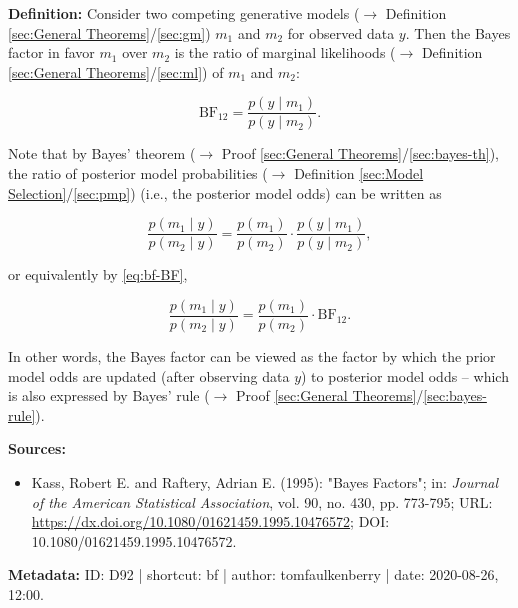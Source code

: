 \documentclass[a4paper,12pt,twoside]{book}
\begin{document}
\textbf{Definition:} Consider two competing generative models ($\rightarrow$ Definition \ref{sec:General Theorems}/\ref{sec:gm}) $m_1$ and $m_2$ for observed data $y$. Then the Bayes factor in favor $m_1$ over $m_2$ is the ratio of marginal likelihoods ($\rightarrow$ Definition \ref{sec:General Theorems}/\ref{sec:ml}) of $m_1$ and $m_2$:

\begin{equation} \label{eq:bf-BF}
\text{BF}_{12} = \frac{p(y\mid m_1)}{p(y\mid m_2)}.
\end{equation}

Note that by Bayes' theorem ($\rightarrow$ Proof \ref{sec:General Theorems}/\ref{sec:bayes-th}), the ratio of posterior model probabilities ($\rightarrow$ Definition \ref{sec:Model Selection}/\ref{sec:pmp}) (i.e., the posterior model odds) can be written as

\begin{equation} \label{eq:bf-odds}
\frac{p(m_1 \mid y)}{p(m_2 \mid y)} = \frac{p(m_1)}{p(m_2)} \cdot \frac{p(y\mid m_1)}{p(y\mid m_2)},
\end{equation}

or equivalently by \eqref{eq:bf-BF},

\begin{equation} \label{eq:bf-odds2}
\frac{p(m_1 \mid y)}{p(m_2 \mid y)} = \frac{p(m_1)}{p(m_2)} \cdot \text{BF}_{12}.
\end{equation}

In other words, the Bayes factor can be viewed as the factor by which the prior model odds are updated (after observing data $y$) to posterior model odds – which is also expressed by Bayes' rule ($\rightarrow$ Proof \ref{sec:General Theorems}/\ref{sec:bayes-rule}).


\vspace{1em}
\textbf{Sources:}
\begin{itemize}
\item Kass, Robert E. and Raftery, Adrian E. (1995): "Bayes Factors"; in: \textit{Journal of the American Statistical Association}, vol. 90, no. 430, pp. 773-795; URL: \url{https://dx.doi.org/10.1080/01621459.1995.10476572}; DOI: 10.1080/01621459.1995.10476572.
\end{itemize}


\vspace{1em}
\textbf{Metadata:} ID: D92 | shortcut: bf | author: tomfaulkenberry | date: 2020-08-26, 12:00.
\vspace{1em}
\end{document}
